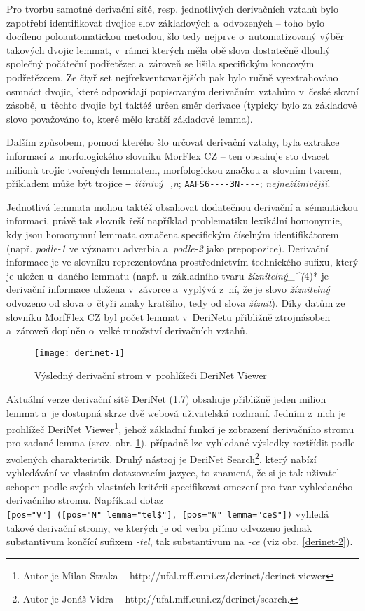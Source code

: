 Pro tvorbu samotné derivační sítě, resp. jednotlivých derivačních vztahů
bylo zapotřebí identifikovat dvojice slov základových a~odvozených --
toho bylo docíleno poloautomatickou metodou, šlo tedy nejprve
o~automatizovaný výběr takových dvojic lemmat, v~rámci kterých měla obě
slova dostatečně dlouhý společný počáteční podřetězec a~zároveň se
lišila specifickým koncovým podřetězcem. Ze čtyř set
nejfrekventovanějších pak bylo ručně vyextrahováno osmnáct dvojic, které
odpovídají popisovaným derivačním vztahům v~české slovní zásobě,
u~těchto dvojic byl taktéž určen směr derivace (typicky bylo za základové
slovo považováno to, které mělo kratší základové lemma).
\parencite{derinet-cz}

Dalším způsobem, pomocí kterého šlo určovat derivační vztahy, byla
extrakce informací z~morfologického slovníku MorFlex CZ -- ten obsahuje
sto dvacet milionů trojic tvořených lemmatem, morfologickou značkou
a~slovním tvarem, příkladem může být trojice ‒ \emph{žížnivý\_,n};
\texttt{AAFS6-\/-\/-\/-3N-\/-\/-\/-}; \emph{nejnežížnivější}.
\parencite{morflex}

Jednotlivá lemmata mohou taktéž obsahovat dodatečnou derivační
a~sémantickou informaci, právě tak slovník řeší například problematiku
lexikální homonymie, kdy jsou homonymní lemmata označena specifickým
číselným identifikátorem (např. \emph{podle-1} ve významu adverbia
a~\emph{podle-2} jako prepopozice). Derivační informace je ve slovníku
reprezentována prostřednictvím technického sufixu, který je uložen
u~daného lemmatu (např. u~základního tvaru \emph{žíznitelný\_\^{}(}4)* je
derivační informace uložena v~závorce a~vyplývá z~ní, že je slovo
\emph{žíznitelný} odvozeno od slova o~čtyři znaky kratšího, tedy od
slova \emph{žíznit}). Díky datům ze slovníku MorfFlex CZ byl počet
lemmat v~DeriNetu přibližně ztrojnásoben a~zároveň doplněn o~velké
množství derivačních vztahů.~\parencite{sevcikova16}

\begin{figure}[ht]   
    \centering
    \texttt{[image: derinet-1]}  
    \caption{Výsledný derivační strom v~prohlížeči DeriNet Viewer~\parencite{derinet}}
    \label{derinet-1}
 \end{figure}

Aktuální verze derivační sítě DeriNet (1.7) obsahuje přibližně jeden
milion lemmat a~je dostupná skrze dvě webová uživatelská rozhraní.
Jedním z~nich je prohlížeč DeriNet
Viewer\footnote{Autor je Milan Straka -- http://ufal.mff.cuni.cz/derinet/derinet-viewer},
jehož základní funkcí je zobrazení derivačního stromu pro zadané lemma
(srov. obr. \ref{derinet-1}), případně lze vyhledané výsledky roztřídit
podle zvolených charakteristik. Druhý nástroj je DeriNet
Search\footnote{Autor je Jonáš Vidra -- http://ufal.mff.cuni.cz/derinet/search.},
který nabízí vyhledávání ve vlastním dotazovacím jazyce, to znamená, že
si je tak uživatel schopen podle svých vlastních kritérii specifikovat
omezení pro tvar vyhledaného derivačního stromu. Například dotaz
\texttt{{[}pos="V"{]}\ ({[}pos="N"\ lemma="tel\$"{]},\ {[}pos="N"\ lemma="ce\$"{]})}
vyhledá takové derivační stromy, ve kterých je od verba přímo odvozeno
jednak substantivum končící sufixem \emph{-tel}, tak substantivum na
\emph{-ce} (viz obr. \ref{derinet-2}).~\parencite{derinet-cz}

